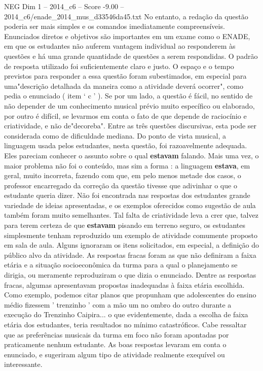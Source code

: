 \begin{textsample}{NEG Dim 1 – 2014\_c6 – Score -9.00 – 2014\_c6/enade\_2014\_mus\_d33546da45.txt}
No entanto, a redação da questão poderia ser mais simples e os comandos imediatamente compreensíveis.
Enunciados diretos e objetivos são importantes em um exame como o ENADE, em que os estudantes não auferem vantagem individual ao responderem às questões e há uma grande quantidade de questões a serem respondidas.
O padrão de resposta utilizado foi suficientemente claro e justo.
O espaço e o tempo previstos para responder a essa questão foram subestimados, em especial para uma"descrição detalhada da maneira como a atividade deverá ocorrer", como pedia o enunciado ( item ‘ c ' ).
Se por um lado, a questão é fácil, no sentido de não depender de um conhecimento musical prévio muito específico ou elaborado, por outro é difícil, se levarmos em conta o fato de que depende de raciocínio e criatividade, e não de"decoreba".
Entre as três questões discursivas, esta pode ser considerada como de dificuldade mediana.
Do ponto de vista musical, a linguagem usada pelos estudantes, nesta questão, foi razoavelmente adequada.
Eles pareciam conhecer o assunto sobre o qual \textbf{estavam} falando.
Mais uma vez, o maior problema não foi o conteúdo, mas sim a forma : a linguagem \textbf{estava}, em geral, muito incorreta, fazendo com que, em pelo menos metade dos casos, o professor encarregado da correção da questão tivesse que adivinhar o que o estudante queria dizer.
Não foi encontrada nas respostas dos estudantes grande variedade de ideias apresentadas, e os exemplos oferecidos como sugestão de aula também foram muito semelhantes.
Tal falta de criatividade leva a crer que, talvez para terem certeza de que \textbf{estavam} pisando em terreno seguro, os estudantes simplesmente tenham reproduzido um exemplo de atividade comumente proposto em sala de aula.
Alguns ignoraram os itens solicitados, em especial, a definição do público alvo da atividade.
As respostas fracas foram as que não definiram a faixa etária e a situação socioeconômica da turma para a qual o planejamento se dirigia, ou meramente reproduziram o que dizia o enunciado.
Dentre as respostas fracas, algumas apresentavam propostas inadequadas à faixa etária escolhida.
Como exemplo, podemos citar planos que propunham que adolescentes do ensino médio fizessem ' trenzinho ' com a mão um no ombro do outro durante a execução do Trenzinho Caipira... o que evidentemente, dada a escolha de faixa etária dos estudantes, teria resultados no mínimo catastróficos.
Cabe ressaltar que as preferências musicais da turma em foco não foram apontadas por praticamente nenhum estudante.
As boas respostas levaram em conta o enunciado, e sugeriram algum tipo de atividade realmente exequível ou interessante.

\end{textsample}
